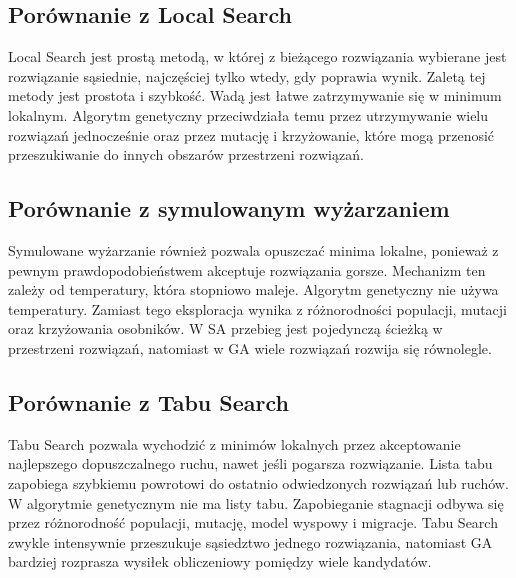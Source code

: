 \documentclass[12pt,a4paper]{article}
\begin{document}
\subsection{Porównanie z Local Search}

Local Search jest prostą metodą, w której z bieżącego rozwiązania wybierane jest rozwiązanie sąsiednie, najczęściej tylko wtedy, gdy poprawia wynik. Zaletą tej metody jest prostota i szybkość. Wadą jest łatwe zatrzymywanie się w minimum lokalnym. Algorytm genetyczny przeciwdziała temu przez utrzymywanie wielu rozwiązań jednocześnie oraz przez mutację i krzyżowanie, które mogą przenosić przeszukiwanie do innych obszarów przestrzeni rozwiązań.

\subsection{Porównanie z symulowanym wyżarzaniem}

Symulowane wyżarzanie również pozwala opuszczać minima lokalne, ponieważ z pewnym prawdopodobieństwem akceptuje rozwiązania gorsze. Mechanizm ten zależy od temperatury, która stopniowo maleje. Algorytm genetyczny nie używa temperatury. Zamiast tego eksploracja wynika z różnorodności populacji, mutacji oraz krzyżowania osobników. W SA przebieg jest pojedynczą ścieżką w przestrzeni rozwiązań, natomiast w GA wiele rozwiązań rozwija się równolegle.

\subsection{Porównanie z Tabu Search}

Tabu Search pozwala wychodzić z minimów lokalnych przez akceptowanie najlepszego dopuszczalnego ruchu, nawet jeśli pogarsza rozwiązanie. Lista tabu zapobiega szybkiemu powrotowi do ostatnio odwiedzonych rozwiązań lub ruchów. W algorytmie genetycznym nie ma listy tabu. Zapobieganie stagnacji odbywa się przez różnorodność populacji, mutację, model wyspowy i migracje. Tabu Search zwykle intensywnie przeszukuje sąsiedztwo jednego rozwiązania, natomiast GA bardziej rozprasza wysiłek obliczeniowy pomiędzy wiele kandydatów.
\end{document}
